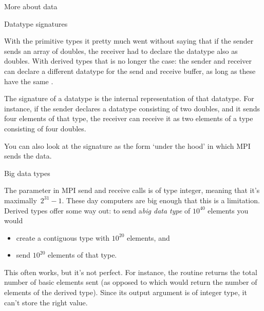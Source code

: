 
 {More about data}

 {Datatype signatures}
\label{sec:signature}

With the primitive types it pretty much went
without saying that if the sender sends an array of doubles, the
receiver had to declare the datatype also as doubles. With derived
types that is no longer the case: the sender and receiver can declare
a different datatype for the send and receive buffer, as long as these
have the same .

The signature of a datatype is the internal representation of that
datatype. For instance, if the sender declares a datatype consisting
of two doubles, and it sends four elements of that type, the receiver
can receive it as two elements of a type consisting of four doubles.

You can also look at the signature as the form `under the hood' in which MPI
sends the data.


 {Big data types}

The  parameter in MPI send and receive calls is of type integer,
meaning that it's maximally~$2^{31}-1$. These day computers are big enough
that this is a limitation. Derived types offer some way out: to send
a\emph{big data type} of $10^{40}$ elements you would
\begin{itemize}
\item create a contiguous type with $10^{20}$ elements, and
\item send $10^{20}$ elements of that type.
\end{itemize}
This often works, but it's not perfect. For instance, the routine
 returns the total number of basic elements sent
(as opposed to  which would return the number
of elements of the derived type). Since its output argument is
of integer type, it can't store the right value.

